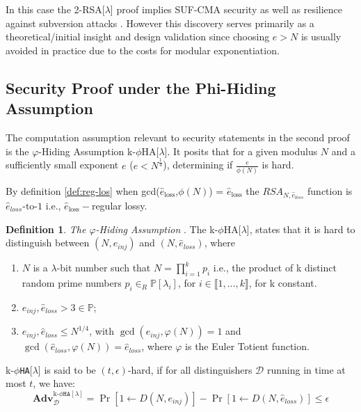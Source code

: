 \documentclass[]{final_report}
\theoremstyle{definition}
\newtheorem{definition}{Definition}[chapter]
\begin{document}
In this case the 2-RSA[\(\lambda\)] proof implies SUF-CMA security as well as resilience against subversion attacks \cite{ateniese2015subversion}. However this discovery serves primarily as a theoretical/initial insight and design validation since choosing \( e > N \) is usually avoided in practice due to the costs for modular exponentiation. 

\subsection{Security Proof under the Phi-Hiding Assumption}
The computation assumption relevant to security statements in the second proof is the $\varphi$-Hiding Assumption k-$\phi$HA[$\lambda$]. 
It posits that for a given modulus \( N \) and a sufficiently small exponent \( e \) (\( e < N^{\frac{1}{4}} \)), determining if \(\frac{e}{\phi(N)}\) is hard. 

By definition \ref{def:reg-los} when gcd(\( \hat{e}_{\text{loss}} \),\( \phi(N) \)) = \( \hat{e}_{\text{loss}} \) the $RSA_{N, \hat{e}_{loss}}$ function is \( \hat{e}_{loss}{\text{-to-}}1 \) i.e., \( \hat{e}_{\text{loss}}- \)regular lossy.

\begin{definition}
\textit{The $\varphi$-Hiding Assumption} \cite{10.1007/3-540-48910-X_28}. The k-$\phi$HA[$\lambda$], states that it is hard to distinguish between $(N,e_{inj})$ and $(N,\hat{e}_{loss})$, where 
\begin{enumerate}
\item $N$ is a $\lambda$-bit number such that $N = \displaystyle\prod_{i=1}^{k} p_i$ i.e., the product of k distinct random prime numbers $p_i \in_{R} \mathbb{P}[\lambda_i]$, for $i \in \llbracket1, \ldots, k \rrbracket$, for k constant.  
\item $e_{inj}, \hat{e}_{loss} > 3 \in \mathbb{P}$;
\item $e_{inj}, \hat{e}_{loss} \leq N^{1/4}$, with $\gcd(e_{inj}, \varphi(N)) = 1$ and $\gcd(\hat{e}_{loss}, \varphi(N)) = \hat{e}_{loss}$, where $\varphi$ is the Euler Totient function. 
\end{enumerate}
k-$\phi$\texttt{HA}[$\lambda$] is said to be $(t, \epsilon)$-hard, if for all distinguishers $\mathcal{D}$ running in time at most $t$, we have:
\[
\textbf{Adv}^{\text{k-}\phi \texttt{HA}[\lambda]}_\mathcal{D} = \Pr[1 \leftarrow D(N, e_{inj})] - \Pr[1 \leftarrow D(N,\hat{e}_{loss})] \leqslant \epsilon
\]
\end{definition}
\end{document}
